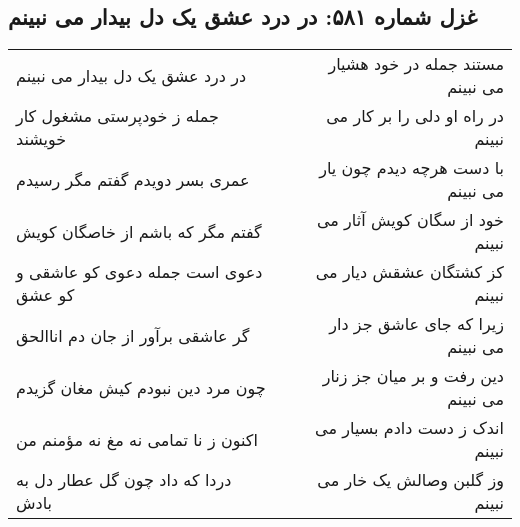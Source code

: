 \begin{center}
\section*{غزل شماره ۵۸۱: در درد عشق یک دل بیدار می نبینم}
\label{sec:581}
\begin{longtable}{l p{0.5cm} r}
در درد عشق یک دل بیدار می نبینم
&&
مستند جمله در خود هشیار می نبینم
\\
جمله ز خودپرستی مشغول کار خویشند
&&
در راه او دلی را بر کار می نبینم
\\
عمری بسر دویدم گفتم مگر رسیدم
&&
با دست هرچه دیدم چون یار می نبینم
\\
گفتم مگر که باشم از خاصگان کویش
&&
خود از سگان کویش آثار می نبینم
\\
دعوی است جمله دعوی کو عاشقی و کو عشق
&&
کز کشتگان عشقش دیار می نبینم
\\
گر عاشقی برآور از جان دم اناالحق
&&
زیرا که جای عاشق جز دار می نبینم
\\
چون مرد دین نبودم کیش مغان گزیدم
&&
دین رفت و بر میان جز زنار می نبینم
\\
اکنون ز نا تمامی نه مغ نه مؤمنم من
&&
اندک ز دست دادم بسیار می نبینم
\\
دردا که داد چون گل عطار دل به بادش
&&
وز گلبن وصالش یک خار می نبینم
\\
\end{longtable}
\end{center}
